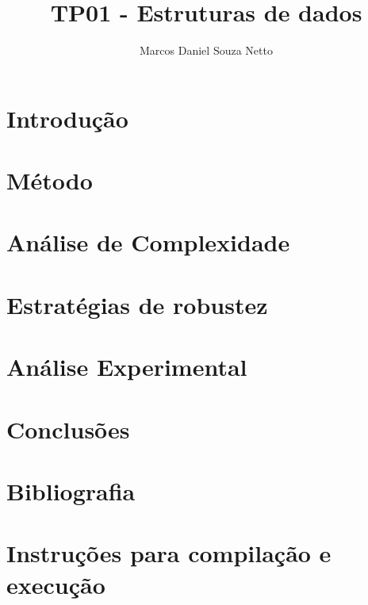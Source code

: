 \documentclass{article}
\title{TP01 - Estruturas de dados}
\author{Marcos Daniel Souza Netto}
\begin{document}
\maketitle

\section{Introdução}

\section{Método}

\section{Análise de Complexidade}

\section{Estratégias de robustez}

\section{Análise Experimental}

\section{Conclusões}

\section*{Bibliografia}

\section*{Instruções para compilação e execução}
\end{document}
